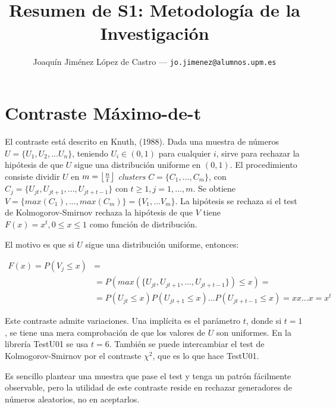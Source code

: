 \documentclass{article}
\title{Resumen de S1: Metodología de la Investigación} %
\author{Joaquín Jiménez López de Castro --- \texttt{jo.jimenez@alumnos.upm.es}} %
\DeclarePairedDelimiter\floor{\lfloor}{\rfloor}
\begin{document}
\onlytitle


\section{Contraste Máximo-de-t}

El contraste está descrito en Knuth, (1988). Dada una muestra de números \(U=\{U_1,U_2,...U_n\}\), teniendo \(U_i \in (0, 1)\) para cualquier \(i\), sirve para rechazar la hipótesis de que \(U\) sigue una distribución uniforme en \((0,1)\). El procedimiento consiste dividir \(U\) en \(m=\floor*{\frac{n}{t}}\) \emph{clusters} \(C=\{C_1,...,C_m\}\), con \(C_j=\{U_{jt},U_{jt+1},...,U_{jt+t-1}\}\) con \(t\ge1, j=1,...,m\). Se obtiene \(V=\{max(C_1),...,max(C_m)\}=\{V_1,...V_m\}\). La hipótesis se rechaza si el test de Kolmogorov-Smirnov rechaza la hipótesis de que \(V\) tiene \(F(x)=x^t, 0\le x\le 1\) como función de distribución.

El motivo es que si \(U\) sigue una distribución uniforme, entonces:

\begin{align*}
    F(x)=P(V_j \le x)&=\\
                &=P(max(\{U_{jt},U_{jt+1},...,U_{jt+t-1}\})\le x)=\\
                &=P(U_{jt}\le x)P(U_{jt+1}\le x)...P(U_{jt+t-1}\le x)=xx...x=x^t
\end{align*}

Este contraste admite variaciones. Una implícita es el parámetro \(t\), donde si \(t=1\), se tiene una mera comprobación de que los valores de \(U\) son uniformes. En la librería TestU01 se usa \(t=6\). También se puede intercambiar el test de Kolmogorov-Smirnov por el contraste \(\chi^2\), que es lo que hace TestU01.

Es sencillo plantear una muestra que pase el test y tenga un patrón fácilmente observable, pero la utilidad de este contraste reside en rechazar generadores de números aleatorios, no en aceptarlos.  
\end{document}
